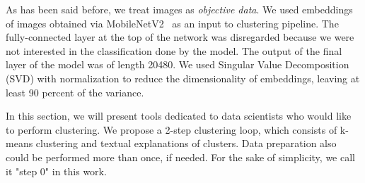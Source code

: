 \documentclass[
 twocolumn,
 hf,
]{ceurart}
\begin{document}
As has been said before, we treat images as \textit{objective data}.
We used embeddings of images obtained via MobileNetV2~\cite{sandler2019mobilenetv2} as an input to clustering pipeline.
The fully-connected layer at the top of the network was disregarded because we were not interested in the classification done by the model.
The output of the final layer of the model was of length 20480.
We used Singular Value Decomposition (SVD) with normalization to reduce the dimensionality of embeddings, leaving at least 90 percent of the variance.

In this section, we will present tools dedicated to data scientists who would like to perform clustering.
We propose a 2-step clustering loop, which consists of k-means clustering and textual explanations of clusters.
Data preparation also could be performed more than once, if needed.
For the sake of simplicity, we call it "step 0" in this work.
\end{document}
